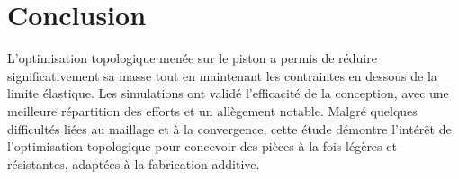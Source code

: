 \documentclass{rapportECL}
\begin{document}
\section{Conclusion}
\label{sec:conclusion}

L'optimisation topologique menée sur le piston a permis de réduire significativement sa masse tout en maintenant les contraintes en dessous de la limite élastique. Les simulations ont validé l'efficacité de la conception, avec une meilleure répartition des efforts et un allègement notable. Malgré quelques difficultés liées au maillage et à la convergence, cette étude démontre l'intérêt de l'optimisation topologique pour concevoir des pièces à la fois légères et résistantes, adaptées à la fabrication additive.
\end{document}

